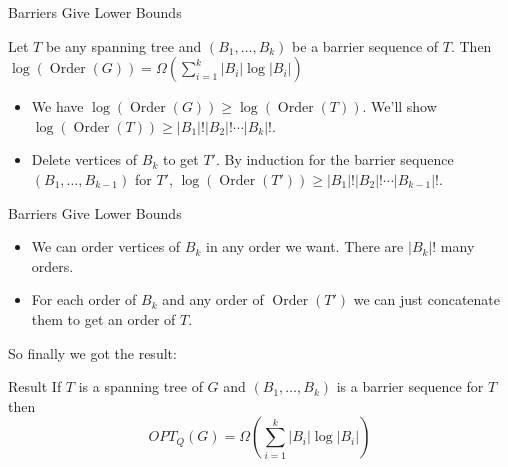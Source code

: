 \documentclass[10pt]{beamer}
\DeclareMathOperator{\order}{Order}
\begin{document}
\begin{frame}{Barriers Give Lower Bounds}
    \begin{theorem}
        Let $T$ be any spanning tree and $(B_1,\dots, B_k)$ be a barrier sequence of $T$. Then $\log(\order(G))=\Omega\left(\sum\limits_{i=1}^k|B_i|\log|B_i|\right)$
    \end{theorem}

    \begin{itemize}
        \item We have $\log(\order(G))\geq \log(\order(T))$. We'll show $\log(\order(T))\geq |B_1|!|B_2|!\cdots|B_k|!$. 
        \item Delete vertices of $B_k$ to get $T'$. By induction for the barrier sequence $(B_1,\dots, B_{k-1})$ for $T'$, $\log(\order(T'))\geq |B_1|!|B_2|!\cdots|B_{k-1}|!$. 
    \end{itemize}
\end{frame}

\begin{frame}{Barriers Give Lower Bounds}

    \begin{itemize}
        \item We can order vertices of $B_k$ in any order we want. There are $|B_k|!$ many orders. 
        \item For each order of $B_k$ and any order of $\order(T')$ we can just concatenate them to get an order of $T$.
    \end{itemize}
\vfill

    So finally we got the result: 
    \begin{alertblock}{Result}
		If $T$ is a spanning tree of $G$ and $(B_1,\dots, B_k)$ is a barrier sequence for $T$ then $$OPT_Q(G)=\Omega\left(\sum\limits_{i=1}^k|B_i|\log|B_i|\right)$$
	\end{alertblock}
\end{frame}
\end{document}
